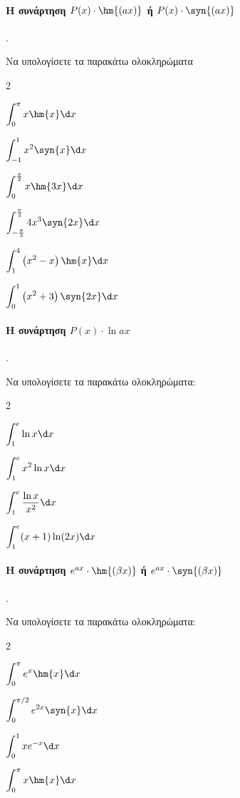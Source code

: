 \documentclass[11pt,a4paper,twocolumn]{article}
\newcounter{askhsh}
\newcommand{\askhsh}{\large\theaskhsh.\ \addtocounter{askhsh}{1}}
\begin{document}
\paragraph{Η συνάρτηση $P(x)\cdot \hm{(ax)}$ ή $P(x)\cdot\syn{(ax)}$}
\askhsh Να υπολογίσετε τα παρακάτω ολοκληρώματα
\begin{multicols}{2}
\begin{alist}
\item $\displaystyle\int_{0}^{\pi}{x\hm{x}\d x}$
\item $\displaystyle\int_{-1}^{1}{x^2\syn{x}\d x} $
\item $\displaystyle\int_{0}^{\frac{\pi}{2}}{x\hm{3x}\d x}$
\item $\displaystyle\int_{-\frac{\pi}{3}}^{\frac{\pi}{3}}{4x^3\syn{2x}\d x}$
\item $\displaystyle\int_{1}^{4}{\left(x^2-x\right)\hm{x} \d x}$
\item $\displaystyle\int_{0}^{1}{\left(x^2+3\right)\syn{2x}\d x}$
\end{alist}
\end{multicols}
\paragraph{Η συνάρτηση $P(x)\cdot \ln{ax}$}
\askhsh Να υπολογίσετε τα παρακάτω ολοκληρώματα:
\begin{multicols}{2}
\begin{alist}
\item $\displaystyle\int_{1}^{e} \ln{x} \d x$
\item $\displaystyle\int_{1}^{e} x^2 \ln{x} \d x$
\item $\displaystyle\int_{1}^{e} \dfrac{\ln{x}}{x^2} \d x$
\item $\displaystyle\int_{1}^{e} (x+1)\ln(2x) \d x$
\end{alist}
\end{multicols}
\paragraph{Η συνάρτηση $e^{ax}\cdot \hm{(\beta x)}$ ή $e^{ax}\cdot \syn{(\beta x)}$}
\askhsh Να υπολογίσετε τα παρακάτω ολοκληρώματα:
\begin{multicols}{2}
\begin{alist}
\item $\displaystyle\int_{0}^{\pi} e^x \hm{x} \d x$
\item $\displaystyle\int_{0}^{\pi/2} e^{2x} \syn{x} \d x$
\item $\displaystyle\int_{0}^{1} x e^{-x} \d x$
\item $\displaystyle\int_{0}^{\pi} x \hm{x} \d x$
\end{alist}
\end{multicols}
\end{document}
